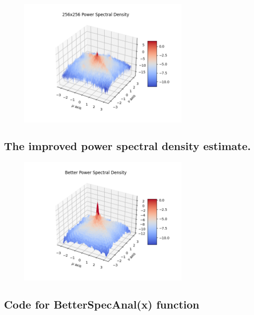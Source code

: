 \documentclass{article}
\begin{document}
\begin{figure}[H]
    \centering
    \includegraphics[width=0.75\textwidth]{../images/log-pwr-spec-density-256x256.png}
    \begin{center}
    \end{center}
\end{figure}
\subsection{The improved power spectral density estimate.}
\begin{figure}[H]
    \centering
    \includegraphics[width=0.75\textwidth]{../images/log-pwr-spec-density-better.png}
    \begin{center}
    \end{center}
\end{figure}
\subsection{Code for BetterSpecAnal(x) function}

\end{document}
